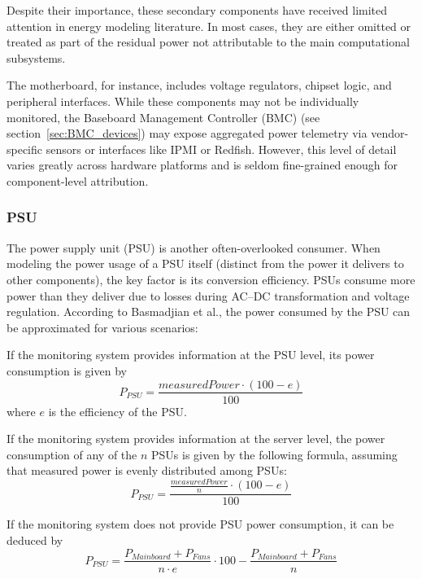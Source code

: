 Despite their importance, these secondary components have received limited attention in energy modeling literature. In most cases, they are either omitted or treated as part of the residual power not attributable to the main computational subsystems.

The motherboard, for instance, includes voltage regulators, chipset logic, and peripheral interfaces. While these components may not be individually monitored, the Baseboard Management Controller (BMC) (see section~\ref{sec:BMC_devices}) may expose aggregated power telemetry via vendor-specific sensors or interfaces like IPMI or Redfish. However, this level of detail varies greatly across hardware platforms and is seldom fine-grained enough for component-level attribution.

\subsubsection{PSU}
The power supply unit (PSU) is another often-overlooked consumer. When modeling the power usage of a PSU itself (distinct from the power it delivers to other components), the key factor is its conversion efficiency. PSUs consume more power than they deliver due to losses during AC–DC transformation and voltage regulation. According to Basmadjian et al.\parencite{basmadjianCloudComputingIts2012}, the power consumed by the PSU can be approximated for various scenarios:

If the monitoring system provides information at the PSU level, its power consumption is given by
\begin{equation}
    P_{PSU} = \frac{measuredPower \cdot (100 - e)}{100}
\end{equation}
where $e$ is the efficiency of the PSU.

If the monitoring system provides information at the server level, the power consumption of any of the $n$ PSUs is given by the following formula, assuming that measured power is evenly distributed among PSUs:
\begin{equation}
    P_{PSU} = \frac{\frac{measuredPower}{n} \cdot (100 - e)}{100}
\end{equation}

If the monitoring system does not provide PSU power consumption, it can be deduced by
\begin{equation}
    P_{PSU} = \frac{P_{Mainboard} + P_{Fans}}{n \cdot e} \cdot 100 - \frac{P_{Mainboard} + P_{Fans}}{n}
\end{equation}

